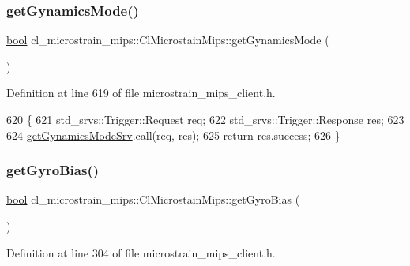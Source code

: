 \subsubsection{\texorpdfstring{get\+Gynamics\+Mode()}{getGynamicsMode()}}
{\footnotesize\ttfamily \hyperlink{classbool}{bool} cl\+\_\+microstrain\+\_\+mips\+::\+Cl\+Microstain\+Mips\+::get\+Gynamics\+Mode (\begin{DoxyParamCaption}{ }\end{DoxyParamCaption})\hspace{0.3cm}{\ttfamily [inline]}}



Definition at line 619 of file microstrain\+\_\+mips\+\_\+client.\+h.


\begin{DoxyCode}
620     \{
621         std\_srvs::Trigger::Request req;
622         std\_srvs::Trigger::Response res;
623 
624         \hyperlink{classcl__microstrain__mips_1_1ClMicrostainMips_a5ded1b1b3506d16e56d312b3d1a7fe13}{getGynamicsModeSrv}.call(req, res);
625         \textcolor{keywordflow}{return} res.success;
626     \}
\end{DoxyCode}
\mbox{\label{classcl__microstrain__mips_1_1ClMicrostainMips_aaa1e9015c879e48776a803f55add33e2}} 
\subsubsection{\texorpdfstring{get\+Gyro\+Bias()}{getGyroBias()}}
{\footnotesize\ttfamily \hyperlink{classbool}{bool} cl\+\_\+microstrain\+\_\+mips\+::\+Cl\+Microstain\+Mips\+::get\+Gyro\+Bias (\begin{DoxyParamCaption}{ }\end{DoxyParamCaption})\hspace{0.3cm}{\ttfamily [inline]}}



Definition at line 304 of file microstrain\+\_\+mips\+\_\+client.\+h.


